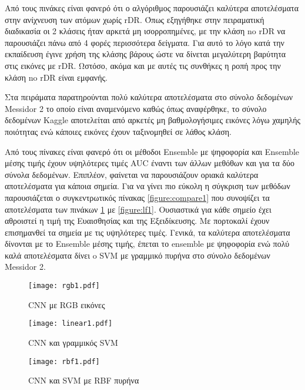 Από τους πινάκες είναι φανερό ότι ο αλγόριθμος παρουσιάζει καλύτερα αποτελέσματα στην ανίχνευση των ατόμων χωρίς rDR. Όπως εξηγήθηκε στην πειραματική διαδικασία οι 2 κλάσεις ήταν αρκετά μη ισορροπημένες, με την κλάση no rDR να παρουσιάζει πάνω από 4 φορές περισσότερα δείγματα. Για αυτό το λόγο κατά την εκπαίδευση έγινε χρήση της κλάσης βάρους ώστε να δίνεται μεγαλύτερη βαρύτητα στις εικόνες με rDR. Ωστόσο, ακόμα και με αυτές τις συνθήκες η ροπή προς την κλάση no rDR είναι εμφανής.

Στα πειράματα παρατηρούνται πολύ καλύτερα αποτελέσματα στο σύνολο δεδομένων Messidor 2 το οποίο είναι αναμενόμενο καθώς όπως αναφέρθηκε, το σύνολο δεδομένων Kaggle αποτελείται από αρκετές μη βαθμολογήσιμες εικόνες λόγω χαμηλής ποιότητας ενώ κάποιες εικόνες έχουν ταξινομηθεί σε λάθος κλάση.

Από τους πίνακες είναι φανερό ότι οι μέθοδοι Ensemble με ψηφοφορία και Ensemble μέσης τιμής έχουν υψηλότερες τιμές AUC έναντι των άλλων μεθόθων και για τα δύο σύνολα δεδομένων. Επιπλέον, φαίνεται να παρουσιάζουν οριακά καλύτερα αποτελέσματα για κάποια σημεία. Για να γίνει πιο εύκολη η σύγκριση των μεθόδων παρουσιάζεται ο συγκεντρωτικός πίνακας \ref{figure:compare1} που συνοψίζει τα αποτελέσματα των πινάκων \ref{figure:rgb1} με \ref{figure:lf1}. Ουσιαστικά για κάθε σημείο έχει αθροιστεί η τιμή της Ευαισθησίας και της Εξειδίκευσης. Με πορτοκαλί έχουν επισημανθεί τα σημεία με τις υψηλότερες τιμές. Γενικά, τα καλύτερα αποτελέσματα δίνονται με το Ensemble μέσης τιμής, έπεται το ensemble με ψηφοφορία ενώ πολύ καλά αποτελέσματα δίνει o SVM με γραμμικό πυρήνα στο σύνολο δεδομένων Messidor 2.

\begin{figure}[!h]
    \centering
      \texttt{[image: rgb1.pdf]} \caption{CNN με RGB εικόνες}
      \label{figure:rgb1}    
  \end{figure}
  

\begin{figure}[!h]
    \centering
      \texttt{[image: linear1.pdf]} \caption{CNN και γραμμικός SVM}
      \label{figure:linear1}    
  \end{figure}   
 
  

\begin{figure}[!h]
    \centering
      \texttt{[image: rbf1.pdf]} \caption{CNN και SVM με RBF πυρήνα}
      \label{figure:rbf1}    
  \end{figure}
  
